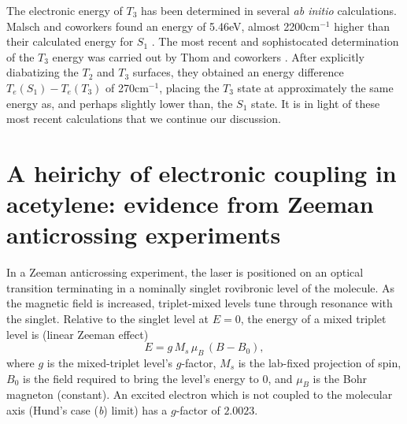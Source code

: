 \documentclass[12pt]{mitthesis}
\begin{document}
  The electronic energy of $T_3$ has been determined in
several \emph{ab initio} calculations.  Malsch and coworkers found an
energy of 5.46eV, almost 2200cm$^{-1}$ higher than their calculated
energy for $S_1$ \cite{malsch98}.  The most recent and sophistocated
determination of the $T_3$ energy was carried out by Thom and
coworkers \cite{thom07}.  After explicitly diabatizing the $T_2$ and
$T_3$ surfaces, they obtained an energy difference $T_e(S_1)-T_e(T_3)$
of 270cm$^{-1}$, placing the $T_3$ state at approximately the same
energy as, and perhaps slightly lower than, the $S_1$ state.  It is in
light of these most recent calculations that we continue our
discussion.






\section{A heirichy of electronic coupling in acetylene: evidence from
  Zeeman anticrossing experiments}

In a Zeeman anticrossing experiment, the laser is positioned on an
optical transition terminating in a nominally singlet rovibronic level
of the molecule.  As the magnetic field is increased, triplet-mixed
levels tune through resonance with the singlet.  Relative to the
singlet level at $E=0$, the energy of a mixed triplet level is (linear
Zeeman effect)
\begin{equation}
E = g \, M_s \, \mu_B \, (B-B_0),
\end{equation}
where $g$ is the mixed-triplet level's $g$-factor, $M_s$ is the
lab-fixed projection of spin, $B_0$ is the field required to bring the
level's energy to 0, and $\mu_B$ is the Bohr magneton (constant).  An
excited electron which is not coupled to the molecular axis (Hund's
case (\emph{b}) limit) has a $g$-factor of $2.0023$.
\end{document}
